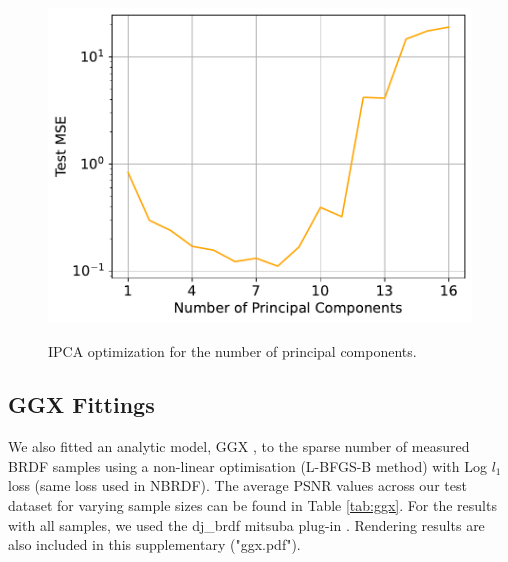 \begin{figure}[h]
  \centering

  {\includegraphics[width=0.5\linewidth]{Chapters/hyperbrdf-figs/ipca_opt_q_40_cropped.pdf}}
   \caption{IPCA optimization for the number of principal components.}
   \label{fig:ipca_opt}
\end{figure}

\begin{table}
    \centering
    \caption{Average Mean squared errors for varying latent space dimensions (first row) and number of principal components (second row)}

    \label{table: z_abl}
\end{table}

\subsection{GGX Fittings}
We also fitted an analytic model, GGX \cite{walter2007microfacet}, to the sparse number of measured BRDF samples using a non-linear optimisation (L-BFGS-B method) with Log $l_1$ loss (same loss used in NBRDF). The average PSNR values across our test dataset for varying sample sizes can be found in Table \ref{tab:ggx}. For the results with all samples, we used the dj\_brdf mitsuba plug-in \cite{dupuy2015photorealistic}. Rendering results are also included in this supplementary ("ggx.pdf").

